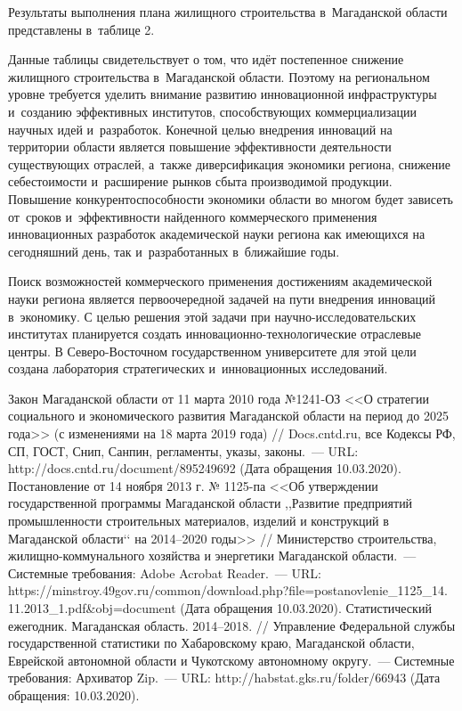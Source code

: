 Результаты выполнения плана жилищного строительства в~Магаданской области представлены в~таблице 2.



Данные таблицы свидетельствует о том, что идёт постепенное снижение жилищного строительства в~Магаданской области. Поэтому на региональном уровне требуется уделить внимание развитию инновационной инфраструктуры и~созданию эффективных институтов, способствующих коммерциализации научных идей и~разработок. Конечной целью внедрения инноваций на территории области является повышение эффективности деятельности существующих отраслей, а~также диверсификация экономики региона, снижение себестоимости и~расширение рынков сбыта производимой продукции.
\clearpage
Повышение конкурентоспособности экономики области во многом будет зависеть от~сроков и~эффективности найденного коммерческого применения инновационных разработок академической науки региона как имеющихся на сегодняшний день, так и~разработанных в~ближайшие годы.

Поиск возможностей коммерческого применения достижениям академической науки региона является первоочередной задачей на пути внедрения инноваций в~экономику. С целью решения этой задачи при научно-исследовательских институтах планируется создать ин\-но\-ва\-цион\-но-тех\-но\-ло\-ги\-чес\-кие отраслевые центры. В Северо-Восточном государственном университете для этой цели создана лаборатория стратегических и~инновационных исследований.

\begin{thebibliography}{99}
\bibitem{}Закон Магаданской области от 11 марта 2010 года №1241-ОЗ <<О стратегии социального и экономического развития Магаданской области на период до 2025 года>> (с изменениями на 18 марта 2019 года) // Docs.cntd.ru, все Кодексы РФ, СП, ГОСТ, Снип, Санпин, регламенты, указы, законы.~--- URL: http://docs.cntd.ru/document/895249692 (Дата обращения 10.03.2020).
\bibitem{}Постановление от 14 ноября 2013 г. № 1125-па <<Об утверждении государственной программы Магаданской области ,,Развитие предприятий промышленности строительных материалов, изделий и конструкций в Магаданской области‘‘ на 2014--2020 годы>> // Министерство строительства, жилищно-коммунального хозяйства и энергетики Магаданской области.~--- Системные требования: Adobe Acrobat Reader.~--- URL:
https://minstroy.49gov.ru/common/download.php?file=postanovlenie\_1125\_14.\\11.2013\_1.pdf\&obj=document (Дата обращения 10.03.2020).
\bibitem{}Статистический ежегодник. Магаданская область. 2014--2018. // Управление Федеральной службы государственной статистики по Хабаровскому краю, Магаданской области, Еврейской автономной области и Чукотскому автономному округу.~--- Системные требования: Архиватор Zip.~--- URL: http://habstat.gks.ru/folder/66943 (Дата обращения: 10.03.2020).

\end{thebibliography}
